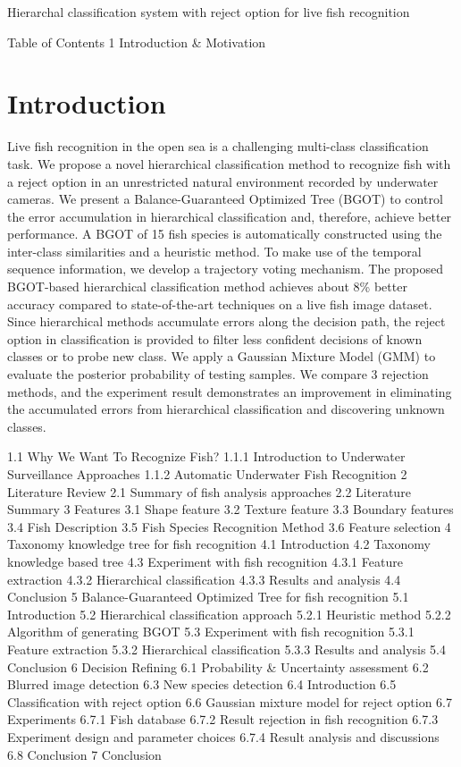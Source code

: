 Hierarchal classification system with reject option for live fish recognition


Table of Contents
1 Introduction & Motivation
\section{Introduction}
\label{sec:introduction}
Live fish recognition in the open sea is a challenging multi-class classification task. We propose a novel hierarchical classification method to recognize fish with a reject option in an unrestricted natural environment recorded by underwater cameras. We present a Balance-Guaranteed Optimized Tree (BGOT) to control the error accumulation in hierarchical classification and, therefore, achieve better performance. A BGOT of 15 fish species is automatically constructed using the inter-class similarities and a heuristic method. To make use of the temporal sequence information, we develop a trajectory voting mechanism. The proposed BGOT-based hierarchical classification method achieves about 8\% better accuracy compared to state-of-the-art techniques on a live fish image dataset. Since hierarchical methods accumulate errors along the decision path, the reject option in classification is provided to filter less confident decisions of known classes or to probe new class. We apply a Gaussian Mixture Model (GMM) to
evaluate the posterior probability of testing samples. We compare 3 rejection methods, and the experiment result demonstrates an improvement in eliminating the accumulated errors from hierarchical classification and discovering unknown classes.

1.1 Why We Want To Recognize Fish?
1.1.1 Introduction to Underwater Surveillance Approaches
1.1.2 Automatic Underwater Fish Recognition
2 Literature Review
2.1 Summary of fish analysis approaches
2.2 Literature Summary
3 Features
3.1 Shape feature
3.2 Texture feature
3.3 Boundary features
3.4 Fish Description
3.5 Fish Species Recognition Method
3.6 Feature selection
4 Taxonomy knowledge tree for fish recognition
4.1 Introduction
4.2 Taxonomy knowledge based tree
4.3 Experiment with fish recognition
4.3.1 Feature extraction
4.3.2 Hierarchical classification
4.3.3 Results and analysis
4.4 Conclusion
5 Balance-Guaranteed Optimized Tree for fish recognition
5.1 Introduction
5.2 Hierarchical classification approach
5.2.1 Heuristic method
5.2.2 Algorithm of generating BGOT
5.3 Experiment with fish recognition
5.3.1 Feature extraction
5.3.2 Hierarchical classification
5.3.3 Results and analysis
5.4 Conclusion
6 Decision Refining
6.1 Probability & Uncertainty assessment
6.2 Blurred image detection
6.3 New species detection
6.4 Introduction
6.5 Classification with reject option
6.6 Gaussian mixture model for reject option
6.7 Experiments
6.7.1 Fish database
6.7.2 Result rejection in fish recognition
6.7.3 Experiment design and parameter choices
6.7.4 Result analysis and discussions
6.8 Conclusion
7 Conclusion
